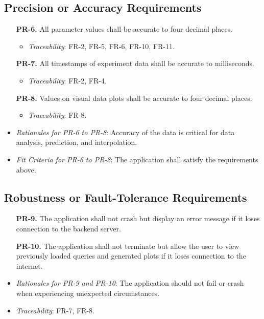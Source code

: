 \documentclass[12pt]{article}
\begin{document}
\subsection{Precision or Accuracy Requirements}
\begin{enumerate}
  \item[\textbf{PR-6.}] All parameter values shall be accurate to four decimal places.
    \begin{itemize}
      \item \textit{Traceability}: FR-2, FR-5, FR-6, FR-10, FR-11.
    \end{itemize}
  \item[\textbf{PR-7.}] All timestamps of experiment data shall be accurate to milliseconds.
    \begin{itemize}
      \item \textit{Traceability}: FR-2, FR-4.
    \end{itemize}
  \item[\textbf{PR-8.}] Values on visual data plots shall be accurate to four decimal places.
    \begin{itemize}
        \item \textit{Traceability}: FR-8.
    \end{itemize}
\end{enumerate}
\begin{itemize}
  \item \textit{Rationales for PR-6 to PR-8}: Accuracy of the data is critical for data analysis, prediction, and interpolation.
  \item \textit{Fit Criteria for PR-6 to PR-8}: The application shall satisfy the requirements above.
\end{itemize}

\subsection{Robustness or Fault-Tolerance Requirements}
\begin{enumerate}
  \item[\textbf{PR-9.}] The application shall not crash but display an error message if it loses connection to the backend server.
  \item[\textbf{PR-10.}] The application shall not terminate but allow the user to view previously loaded queries and generated plots if it loses connection to the internet.
\end{enumerate}
\begin{itemize}
  \item \textit{Rationales for PR-9 and PR-10}: The application should not fail or crash when experiencing unexpected circumstances.
  \item \textit{Traceability}: FR-7, FR-8.
\end{itemize}
\end{document}
